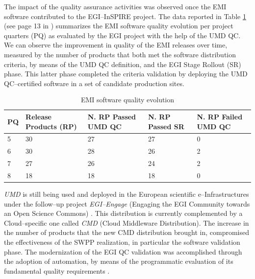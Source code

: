 The impact of the quality assurance activities was observed once the EMI software contributed to the
EGI--InSPIRE project. The data reported in Table \ref{tab:emi} (see page 13 in \cite{emi-quality-model})
summarizes the EMI software quality evolution per project quarters (PQ) as evaluated by the EGI project
with the help of the UMD QC. We can observe the improvement in quality of the EMI releases over time,
measured by the number of products that both met the software distribution criteria, by means of the UMD QC
definition, and the EGI Stage Rollout (SR) phase. This latter phase completed the criteria validation by
deploying the UMD QC--certified software in a set of candidate production sites.

\begin{table}[!h]
\renewcommand{\arraystretch}{1.3}
\caption{EMI software quality evolution}
\label{tab:emi}
\centering
\begin{tabular}{lp{2.5cm}p{2.2cm}p{1.9cm}p{2.1cm}}
\hline
\hline
PQ & Release Products (RP) & N. RP Passed UMD QC & N. RP Passed SR & N. RP Failed UMD QC\\
\hline
\hline
5 & 30 & 27 & 27 & 0\\
6 & 30 & 28 & 26 & 2 \\
7 & 27 & 26& 24& 2\\
8 & 18 & 18 & 18 & 0\\
\hline
\hline
\end{tabular}
\end{table}


{\sl UMD} is still being used and
deployed in the European scientific e--Infrastructures under the follow--up
project {\sl EGI--Engage} (Engaging the EGI Community towards an Open Science
Commons) \cite{cordis:egi-engage}. This distribution is currently complemented
by a Cloud--specific one called {\sl CMD} (Cloud Middleware Distribution). The
increase in the number of products that the new CMD distribution brought in,
compromised the effectiveness of the SWPP realization, in particular the
software validation phase. The modernization of the EGI QC validation was
accomplished through the adoption of automation, by means of the programmatic
evaluation of its fundamental quality requirements \cite{orviz2018umd}.

%

